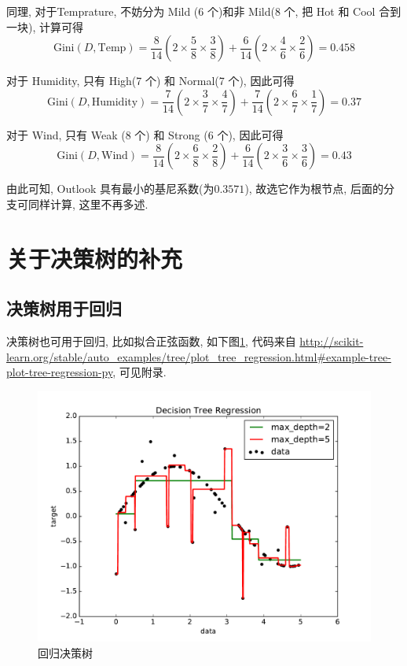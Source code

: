 \documentclass[a4paper,UTF8]{ctexart}
\theoremstyle{plain} \newtheorem{theorem}{定理}[section]
\theoremstyle{plain} \newtheorem{definition}{定义}[section]
\theoremstyle{plain} \newtheorem{lemma}{引理}[section]
\theoremstyle{plain} \newtheorem{proposition}{命题}[section]
\theoremstyle{plain} \newtheorem{example}{例}
\theoremstyle{plain} \newtheorem{remark}{注}
\theoremstyle{plain} \newtheorem{corollary}{推论}[section]
\begin{document}
同理, 对于Temprature, 不妨分为 Mild (6 个)和非 Mild(8 个, 把 Hot 和 Cool 合到一块), 计算可得
\begin{equation*}
\mathrm{Gini}(D, \mathrm{Temp}) = \frac{8}{14} \left( 2 \times \frac{5}{8} \times \frac{3}{8} \right) + \frac{6}{14} \left( 2 \times \frac{4}{6} \times \frac{2}{6} \right) = 0.458
\end{equation*}

对于 Humidity, 只有 High(7 个) 和 Normal(7 个), 因此可得
\begin{equation*}
\mathrm{Gini}(D, \mathrm{Humidity}) = \frac{7}{14} \left( 2 \times \frac{3}{7} \times \frac{4}{7} \right) + \frac{7}{14} \left( 2 \times \frac{6}{7} \times \frac{1}{7} \right) = 0.37
\end{equation*}

对于 Wind, 只有 Weak (8 个) 和  Strong (6 个), 因此可得
\begin{equation*}
\mathrm{Gini}(D, \mathrm{Wind}) = \frac{8}{14} \left( 2 \times \frac{6}{8} \times \frac{2}{8} \right) + \frac{6}{14} \left( 2 \times \frac{3}{6} \times \frac{3}{6} \right) = 0.43
\end{equation*}

由此可知, Outlook 具有最小的基尼系数(为$0.3571$), 故选它作为根节点, 后面的分支可同样计算, 这里不再多述.


\section{关于决策树的补充}
\subsection{决策树用于回归}
决策树也可用于回归, 比如拟合正弦函数, 如下图\ref{regressiontree}, 代码来自 \url{http://scikit-learn.org/stable/auto_examples/tree/plot_tree_regression.html#example-tree-plot-tree-regression-py}, 可见附录.
\begin{figure}[!htb]
    \centering
    \includegraphics[width = 0.75 \textwidth]{regression_tree.pdf}
    \caption{回归决策树}
    \label{regressiontree}
\end{figure}
\end{document}

